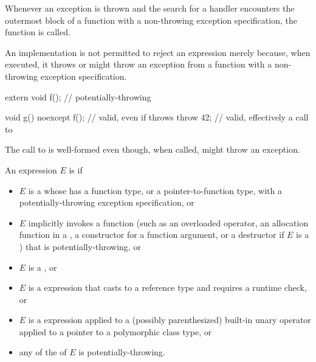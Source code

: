 \pnum
{}%
%
Whenever an exception is thrown
and the search for a handler
encounters the outermost block of a function with a
non-throwing exception specification,
the function  is called.
\begin{note}
An implementation is not permitted to reject an expression merely because, when
executed, it throws or might
throw an exception from a function with a non-throwing exception specification.
\end{note}
\begin{example}
\begin{codeblock}
extern void f();                // potentially-throwing

void g() noexcept {
  f();                          // valid, even if  throws
  throw 42;                     // valid, effectively a call to 
}
\end{codeblock}
The call to
is well-formed even though, when called,
might throw an exception.
\end{example}

\pnum
An expression $E$ is
 if
\begin{itemize}
\item
$E$ is a 
whose 
has a function type,
or a pointer-to-function type,
with a potentially-throwing exception specification,
or
\item
$E$ implicitly invokes a function
(such as an overloaded operator,
an allocation function in a ,
a constructor for a function argument,
or a destructor if $E$ is a )
that is potentially-throwing,
or
\item
$E$ is a ,
or
\item
$E$ is a  expression that casts to a reference type and
requires a runtime check,
or
\item
$E$ is a  expression applied to a
(possibly parenthesized) built-in unary \tcode{*} operator
applied to a pointer to a
polymorphic class type,
or
\item
any of the 
of $E$ is potentially-throwing.
\end{itemize}

